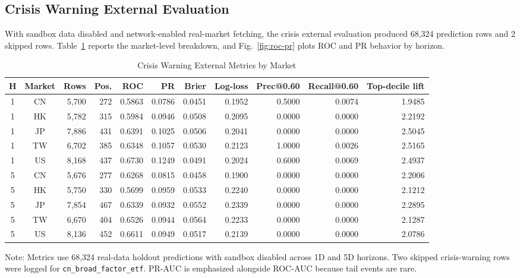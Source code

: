 \documentclass{ieeeaccess}
\newcommand{\tabnote}[1]{\vspace{2pt}\begin{flushleft}\footnotesize Note: #1\end{flushleft}}
\begin{document}
\subsection{Crisis Warning External Evaluation}
With sandbox data disabled and network-enabled real-market fetching, the crisis external evaluation produced 68,324 prediction rows and 2 skipped rows. Table~\ref{tab:crisis} reports the market-level breakdown, and Fig.~\ref{fig:roc-pr} plots ROC and PR behavior by horizon.

\begin{table}[t]
\caption{Crisis Warning External Metrics by Market}
\label{tab:crisis}
\centering
\scriptsize
\begin{tabularx}{\textwidth}{c c r r r r r r r r r}
\toprule
H & Market & Rows & Pos. & ROC & PR & Brier & Log-loss & Prec@0.60 & Recall@0.60 & Top-decile lift \\
\midrule
1 & CN & 5,700 & 272 & 0.5863 & 0.0786 & 0.0451 & 0.1952 & 0.5000 & 0.0074 & 1.9485 \\
1 & HK & 5,782 & 315 & 0.5984 & 0.0946 & 0.0508 & 0.2095 & 0.0000 & 0.0000 & 2.2192 \\
1 & JP & 7,886 & 431 & 0.6391 & 0.1025 & 0.0506 & 0.2041 & 0.0000 & 0.0000 & 2.5045 \\
1 & TW & 6,702 & 385 & 0.6348 & 0.1057 & 0.0530 & 0.2123 & 1.0000 & 0.0026 & 2.5165 \\
1 & US & 8,168 & 437 & 0.6730 & 0.1249 & 0.0491 & 0.2024 & 0.6000 & 0.0069 & 2.4937 \\
5 & CN & 5,676 & 277 & 0.6268 & 0.0815 & 0.0458 & 0.1900 & 0.0000 & 0.0000 & 2.2006 \\
5 & HK & 5,750 & 330 & 0.5699 & 0.0959 & 0.0533 & 0.2240 & 0.0000 & 0.0000 & 2.1212 \\
5 & JP & 7,854 & 467 & 0.6339 & 0.0932 & 0.0552 & 0.2339 & 0.0000 & 0.0000 & 2.2895 \\
5 & TW & 6,670 & 404 & 0.6526 & 0.0944 & 0.0564 & 0.2233 & 0.0000 & 0.0000 & 2.1287 \\
5 & US & 8,136 & 452 & 0.6611 & 0.0949 & 0.0517 & 0.2139 & 0.0000 & 0.0000 & 2.0786 \\
\bottomrule
\end{tabularx}
\tabnote{Metrics use 68,324 real-data holdout predictions with sandbox disabled across 1D and 5D horizons. Two skipped crisis-warning rows were logged for \texttt{cn\_broad\_factor\_etf}. PR-AUC is emphasized alongside ROC-AUC because tail events are rare.}
\end{table}
\end{document}
